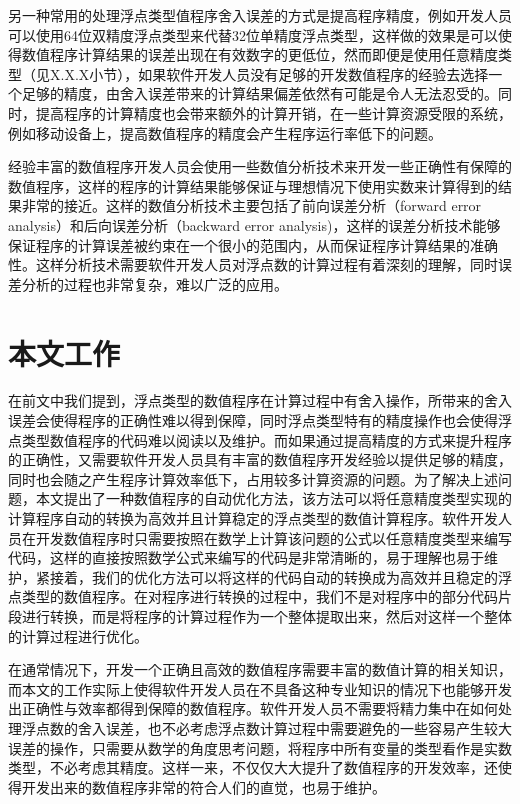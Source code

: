 另一种常用的处理浮点类型值程序舍入误差的方式是提高程序精度，例如开发人员可以使用64位双精度浮点类型来代替32位单精度浮点类型，这样做的效果是可以使得数值程序计算结果的误差出现在有效数字的更低位，然而即便是使用任意精度类型（见X.X.X小节），如果软件开发人员没有足够的开发数值程序的经验去选择一个足够的精度，由舍入误差带来的计算结果偏差依然有可能是令人无法忍受的。同时，提高程序的计算精度也会带来额外的计算开销，在一些计算资源受限的系统，例如移动设备上，提高数值程序的精度会产生程序运行率低下的问题。

经验丰富的数值程序开发人员会使用一些数值分析技术来开发一些正确性有保障的数值程序，这样的程序的计算结果能够保证与理想情况下使用实数来计算得到的结果非常的接近。这样的数值分析技术主要包括了前向误差分析（forward error analysis）和后向误差分析（backward error analysis)，这样的误差分析技术能够保证程序的计算误差被约束在一个很小的范围内，从而保证程序计算结果的准确性。这样分析技术需要软件开发人员对浮点数的计算过程有着深刻的理解，同时误差分析的过程也非常复杂，难以广泛的应用。

\section{本文工作}

在前文中我们提到，浮点类型的数值程序在计算过程中有舍入操作，所带来的舍入误差会使得程序的正确性难以得到保障，同时浮点类型特有的精度操作也会使得浮点类型数值程序的代码难以阅读以及维护。而如果通过提高精度的方式来提升程序的正确性，又需要软件开发人员具有丰富的数值程序开发经验以提供足够的精度，同时也会随之产生程序计算效率低下，占用较多计算资源的问题。为了解决上述问题，本文提出了一种数值程序的自动优化方法，该方法可以将任意精度类型实现的计算程序自动的转换为高效并且计算稳定的浮点类型的数值计算程序。软件开发人员在开发数值程序时只需要按照在数学上计算该问题的公式以任意精度类型来编写代码，这样的直接按照数学公式来编写的代码是非常清晰的，易于理解也易于维护，紧接着，我们的优化方法可以将这样的代码自动的转换成为高效并且稳定的浮点类型的数值程序。在对程序进行转换的过程中，我们不是对程序中的部分代码片段进行转换，而是将程序的计算过程作为一个整体提取出来，然后对这样一个整体的计算过程进行优化。

在通常情况下，开发一个正确且高效的数值程序需要丰富的数值计算的相关知识，而本文的工作实际上使得软件开发人员在不具备这种专业知识的情况下也能够开发出正确性与效率都得到保障的数值程序。软件开发人员不需要将精力集中在如何处理浮点数的舍入误差，也不必考虑浮点数计算过程中需要避免的一些容易产生较大误差的操作，只需要从数学的角度思考问题，将程序中所有变量的类型看作是实数类型，不必考虑其精度。这样一来，不仅仅大大提升了数值程序的开发效率，还使得开发出来的数值程序非常的符合人们的直觉，也易于维护。


